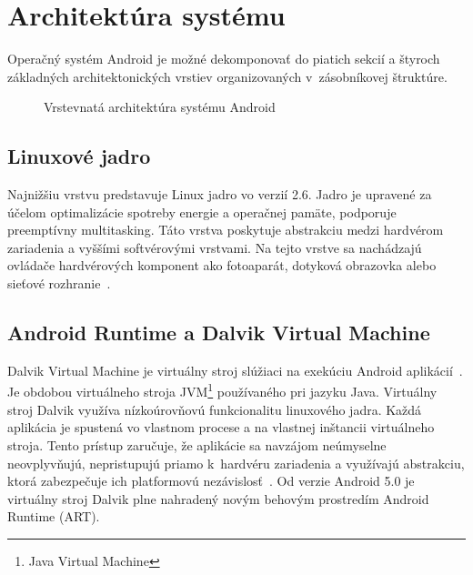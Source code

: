 \section{Architektúra systému}
Operačný systém Android je možné dekomponovať do piatich sekcií a štyroch základných architektonických vrstiev organizovaných v~zásobníkovej štruktúre.
\begin{figure} [htb]
 \centering
  \caption{Vrstevnatá architektúra systému Android}
  \label{fig:mulogo1}
\end{figure}
\subsection{Linuxové jadro}
Najnižšiu vrstvu predstavuje Linux jadro vo verzií 2.6. Jadro je upravené za účelom optimalizácie spotreby energie a operačnej pamäte, podporuje preemptívny multitasking. Táto vrstva poskytuje abstrakciu medzi hardvérom zariadenia a vyššími softvérovými vrstvami. Na tejto vrstve sa nachádzajú ovládače hardvérových komponent ako fotoaparát, dotyková obrazovka alebo sieťové rozhranie~\cite{architecture}.
\subsection{Android Runtime a Dalvik Virtual Machine}
Dalvik Virtual Machine je virtuálny stroj slúžiaci na exekúciu Android aplikácií~\cite{dalvik}. Je obdobou virtuálneho stroja JVM\footnote{Java Virtual Machine} používaného pri jazyku Java. Virtuálny stroj Dalvik využíva nízkoúrovňovú funkcionalitu linuxového jadra. Každá aplikácia je spustená vo vlastnom procese a na vlastnej inštancii virtuálneho stroja. Tento prístup zaručuje, že aplikácie sa navzájom neúmyselne neovplyvňujú, nepristupujú priamo k~hardvéru zariadenia a využívajú abstrakciu, ktorá zabezpečuje ich platformovú nezávislosť~\cite{architecture}.  Od verzie Android 5.0 je virtuálny stroj Dalvik plne nahradený novým behovým prostredím Android Runtime (ART).
